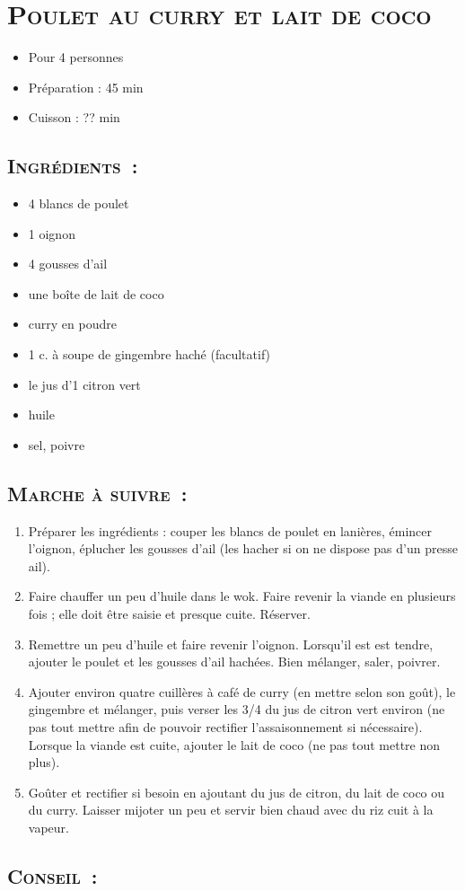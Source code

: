 \section[\normalsize{Poulet au curry et lait de coco}]{\LARGE{\textsc{Poulet au curry et lait de coco}}}		%


\begin{itemize}
\item Pour 4 personnes
\item Préparation : 45 min
\item Cuisson : ?? min
\end{itemize}

\subsection*{\textsc{Ingr\'edients~:}}

\begin{itemize}
\item 4 blancs de poulet
\item 1 oignon
\item 4 gousses d'ail
\item une bo\^ite de lait de coco
\item curry en poudre
\item 1 c. \`a soupe de gingembre hach\'e (facultatif)
\item le jus d'1 citron vert
\item huile
\item sel, poivre
\end{itemize}


\subsection*{\textsc{Marche \`a suivre~:}}

\begin{enumerate}
\item Pr\'eparer les ingr\'edients : couper les blancs de poulet en lani\`eres, \'emincer l'oignon, \'eplucher les gousses d'ail (les hacher si on ne dispose pas d'un presse ail).
\item Faire chauffer un peu d'huile dans le wok. Faire revenir la viande en plusieurs fois ; elle doit \^etre saisie et presque cuite. R\'eserver. 
\item Remettre un peu d'huile et faire revenir l'oignon. Lorsqu'il est est tendre, ajouter le poulet et les gousses d'ail hach\'ees. Bien m\'elanger, saler, poivrer.
\item Ajouter environ quatre cuill\`eres \`a caf\'e de curry (en mettre selon son goût), le gingembre et m\'elanger, puis verser les 3/4 du jus de citron vert environ (ne pas tout mettre afin de pouvoir rectifier l'assaisonnement si n\'ecessaire). Lorsque la viande est cuite, ajouter le lait de coco (ne pas tout mettre non 
plus).
\item Goûter et rectifier si besoin en ajoutant du jus de citron, du lait de coco ou du curry. Laisser mijoter un peu et servir bien chaud avec du riz cuit \`a la vapeur.
\end{enumerate}
\subsection*{\textsc{Conseil~:}}


